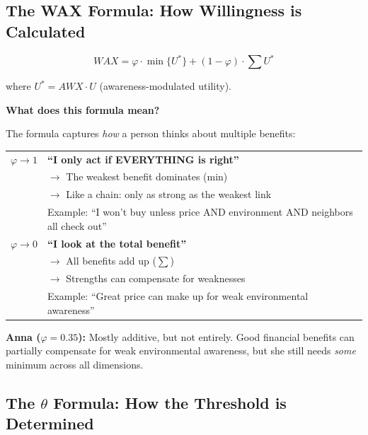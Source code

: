 \subsection{The WAX Formula: How Willingness is Calculated}

\begin{equation}
\boxed{WAX = \varphi \cdot \min\{U^*\} + (1-\varphi) \cdot \sum U^*}
\label{eq:wax-formula}
\end{equation}

where $U^* = AWX \cdot U$ (awareness-modulated utility).

\begin{intuition}
\textbf{What does this formula mean?}

The formula captures \textit{how} a person thinks about multiple benefits:

\begin{center}
\begin{tabular}{cp{10cm}}
$\varphi \rightarrow 1$ & \textbf{``I only act if EVERYTHING is right''}\\
& $\rightarrow$ The weakest benefit dominates (min)\\
& $\rightarrow$ Like a chain: only as strong as the weakest link\\
& Example: ``I won't buy unless price AND environment AND neighbors all check out''\\[8pt]

$\varphi \rightarrow 0$ & \textbf{``I look at the total benefit''}\\
& $\rightarrow$ All benefits add up ($\sum$)\\
& $\rightarrow$ Strengths can compensate for weaknesses\\
& Example: ``Great price can make up for weak environmental awareness''\\
\end{tabular}
\end{center}

\textbf{Anna ($\varphi = 0.35$):} Mostly additive, but not entirely. Good financial benefits can partially compensate for weak environmental awareness, but she still needs \textit{some} minimum across all dimensions.
\end{intuition}

\subsection{The $\theta$ Formula: How the Threshold is Determined}

